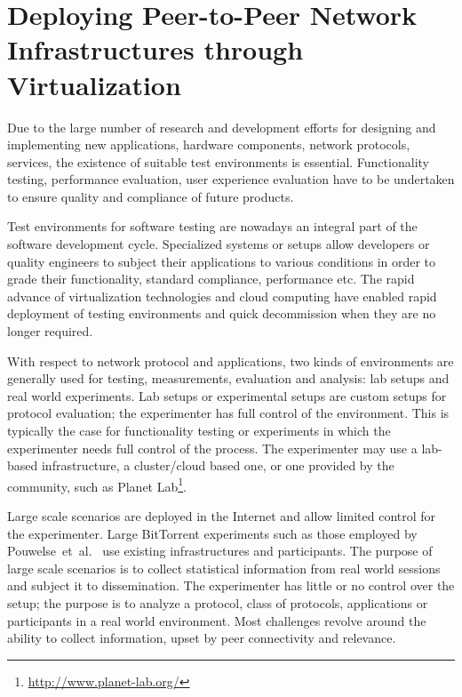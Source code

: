 
\chapter{Deploying Peer-to-Peer Network Infrastructures through
Virtualization}
\label{chapter:virt-infra}

Due to the large number of research and development efforts for designing and
implementing new applications, hardware components, network protocols,
services, the existence of suitable test environments is essential.
Functionality testing, performance evaluation, user experience evaluation have
to be undertaken to ensure quality and compliance of future products.

Test environments for software testing are nowadays an integral part of the
software development cycle. Specialized systems or setups allow developers or
quality engineers to subject their applications to various conditions in order
to grade their functionality, standard compliance, performance etc. The rapid
advance of virtualization technologies and cloud computing have enabled rapid
deployment of testing environments and quick decommission when they are no
longer required.

With respect to network protocol and applications, two kinds of environments
are generally used for testing, measurements, evaluation and analysis: lab
setups and real world experiments. Lab setups or experimental setups are
custom setups for protocol evaluation; the experimenter has full control of
the environment. This is typically the case for functionality testing or
experiments in which the experimenter needs full control of the process. The
experimenter may use a lab-based infrastructure, a cluster/cloud based one, or
one provided by the community, such as Planet
Lab\footnote{\url{http://www.planet-lab.org/}}.

Large scale scenarios are deployed in the Internet and allow limited control
for the experimenter. Large BitTorrent experiments such as those employed by
Pouwelse~et~al.~\cite{measurement-study} use existing infrastructures and
participants. The purpose of large scale scenarios is to collect statistical
information from real world sessions and subject it to dissemination. The
experimenter has little or no control over the setup; the purpose is to
analyze a protocol, class of protocols, applications or participants in a real
world environment. Most challenges revolve around the ability to collect
information, upset by peer connectivity and relevance.

